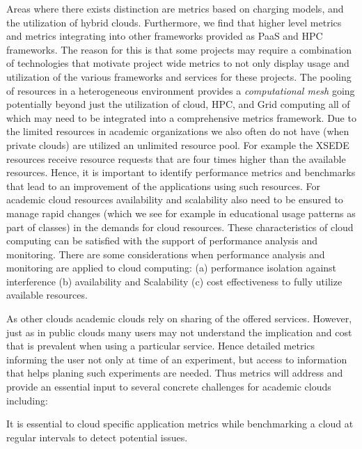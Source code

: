 \documentclass{sig-alternate-05-2015}
\begin{document}
Areas where there exists distinction are metrics based on charging models, and the utilization of hybrid clouds. Furthermore, we find that higher level metrics and metrics integrating into other frameworks provided as PaaS and HPC frameworks. The reason for this is that some projects may require a combination of technologies that motivate project wide metrics to not only display usage and utilization of the various frameworks and services for these projects. The pooling of resources in a heterogeneous environment provides a {\it computational mesh} going potentially beyond just the utilization of cloud, HPC, and Grid computing all of which may need to be integrated into a comprehensive metrics framework. Due to the limited resources in academic organizations we also often do not have (when private clouds) are utilized an unlimited resource pool. For example the XSEDE resources receive resource requests that are four times higher than the available resources. Hence, it is important to identify performance metrics and benchmarks that lead to an improvement of the applications using such resources. For academic cloud resources availability and scalability also need to be ensured to manage rapid changes (which we see for example in educational usage patterns as part of classes) in the demands for cloud resources. These characteristics of cloud computing can be satisfied with the support of performance analysis and monitoring. There are some considerations when performance analysis and monitoring are applied to cloud computing: (a) performance isolation against interference (b) availability and Scalability (c) cost effectiveness to fully utilize available resources.


As other clouds academic clouds rely on sharing of the offered services. However, just as in public clouds many users may not understand the implication and cost that is prevalent when using a particular service. Hence detailed metrics informing the user not only at time of an experiment, but access to information that helps planing such experiments are needed. Thus metrics will address and provide an essential input to several concrete challenges for academic clouds including:



It is essential to cloud specific application metrics while benchmarking a cloud at regular intervals to detect potential issues. 
\end{document}
